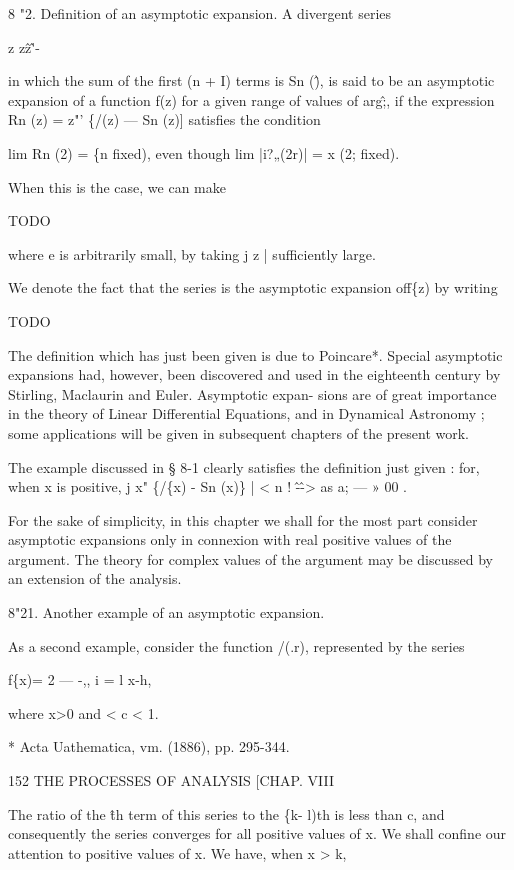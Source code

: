 8 "2. Definition of an asymptotic expansion. 
A divergent series 

z z\^ z\^'- 

in which the sum of the first (n + I) terms is Sn (\^), is said to be an asymptotic 
expansion of a function f(z) for a given range of values of arg\^;, if the 
expression Rn (z) = z"' \{/(z) — Sn (z)] satisfies the condition 

lim Rn (2) = \{n fixed), 
even though lim |i?„(2r)| = x (2; fixed). 

When this is the case, we can make 

TODO

where e is arbitrarily small, by taking j z | sufficiently large. 

We denote the fact that the series is the asymptotic expansion off\{z) by 
writing 

TODO

The definition which has just been given is due to Poincare*. Special 
asymptotic expansions had, however, been discovered and used in the 
eighteenth century by Stirling, Maclaurin and Euler. Asymptotic expan- 
sions are of great importance in the theory of Linear Differential Equations, 
and in Dynamical Astronomy ; some applications will be given in subsequent 
chapters of the present work. 

The example discussed in § 8-1 clearly satisfies the definition just 
given : for, when x is positive, j x" \{/\{x) - Sn (x)\} | < n ! \^-\^ -> as a; — » 00 . 

For the sake of simplicity, in this chapter we shall for the most part consider 
asymptotic expansions only in connexion with real positive values of the argument. 
The theory for complex values of the argument may be discussed by an extension of the 
analysis. 

8"21. Another example of an asymptotic expansion. 

As a second example, consider the function /(.r), represented by the series 



f\{x)= 2 — -,, 
i = l x-\-h, 

where x>0 and < c < 1. 

* Acta Uathematica, vm. (1886), pp. 295-344. 



152 THE PROCESSES OF ANALYSIS [CHAP. VIII 

The ratio of the \^th term of this series to the \{k- l)th is less than c, and consequently 
the series converges for all positive values of x. We shall confine our attention to positive 
values of x. We have, when x > k, 

